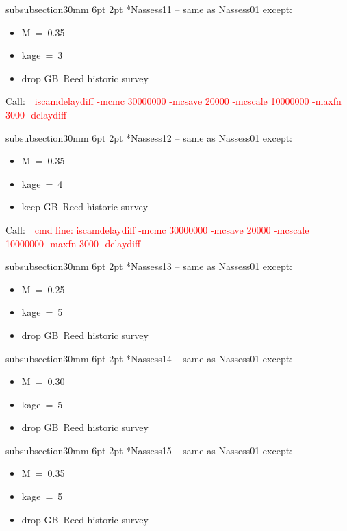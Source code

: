 \documentclass[11pt]{book}
\makeatletter
\newcommand{\red}[1]{{\textcolor{red} {#1}}}
\renewcommand{\subsubsection}{\@startsection%
{subsubsection}{3}{0mm}%
{6pt \@plus -0pt \@minus -0pt}{2pt \@plus 0pt}%
{\normalfont\bf}}%
\newcommand\call[1]{
\footnotesize\selectfont\hangindent=0.35in
Call:~~\red{#1}
\normalsize\selectfont}
\makeatother
\begin{document}
\subsubsection*{Nassess11 -- same as Nassess01 except:}
\begin{itemize}[nosep]
  \item M~=~0.35
  \item kage~=~3
  \item drop GB~Reed historic survey
\end{itemize}
\call{iscamdelaydiff -mcmc 30000000 -mcsave 20000 -mcscale 10000000 -maxfn 3000 -delaydiff}

\subsubsection*{Nassess12 -- same as Nassess01 except:}
\begin{itemize}[nosep]
  \item M~=~0.35
  \item kage~=~4
  \item keep GB~Reed historic survey
\end{itemize}
\call{cmd line: iscamdelaydiff -mcmc 30000000 -mcsave 20000 -mcscale 10000000 -maxfn 3000 -delaydiff}

\subsubsection*{Nassess13 -- same as Nassess01 except:}
\begin{itemize}[nosep]
  \item M~=~0.25
  \item kage~=~5
  \item drop GB~Reed historic survey
\end{itemize}

\subsubsection*{Nassess14 -- same as Nassess01 except:}
\begin{itemize}[nosep]
  \item M~=~0.30
  \item kage~=~5
  \item drop GB~Reed historic survey
\end{itemize}

\subsubsection*{Nassess15 -- same as Nassess01 except:}
\begin{itemize}[nosep]
  \item M~=~0.35
  \item kage~=~5
  \item drop GB~Reed historic survey
\end{itemize}
\end{document}
